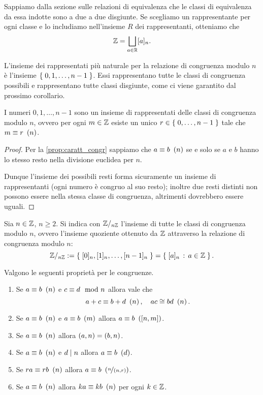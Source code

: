 Sappiamo dalla sezione sulle relazioni di equivalenza che le classi di equivalenza da essa indotte sono a due a due disgiunte. Se scegliamo un rappresentante per ogni classe e lo includiamo nell'insieme $R$ dei rappresentanti, otteniamo che \[
    \mathbb{Z} = \bigsqcup_{a \in \mathbb{R}} [a]_n. 
\]

L'insieme dei rappresentati più naturale per la relazione di congruenza modulo $n$ è l'insieme $\left\{\;0, 1, \dots, n-1\;\right\}$. Essi rappresentano tutte le classi di congruenza possibili e rappresentano tutte classi disgiunte, come ci viene garantito dal prossimo corollario.

\begin{corollary}
    I numeri $0, 1, \dots, n-1$ sono un insieme di rappresentati delle classi di congruenza modulo $n$, ovvero per ogni $m \in \mathbb{Z}$ esiste un unico $r \in \left\{\;0, \dots, n-1\;\right\}$ tale che $m \equiv r \ \left(n\right)$.
\end{corollary}
\begin{proof}
    Per la \autoref{prop:caratt_congr} sappiamo che $a \equiv b \ \left(n\right)$ se e solo se $a$ e $b$ hanno lo stesso resto nella divisione euclidea per $n$.

    Dunque l'insieme dei possibili resti forma sicuramente un insieme di rappresentanti (ogni numero è congruo al suo resto); inoltre due resti distinti non possono essere nella stessa classe di congruenza, altrimenti dovrebbero essere uguali.
\end{proof}

\begin{definition}
    Sia $n \in \mathbb{Z}$, $n \geq 2$. Si indica con $\mathbb{Z}/_{n\mathbb{Z}}$ l'insieme di tutte le classi di congruenza modulo $n$, ovvero l'insieme quoziente ottenuto da $\mathbb{Z}$ attraverso la relazione di congruenza modulo $n$: \begin{equation}
        \mathbb{Z}/_{n\mathbb{Z}} := \left\{\;[0]_n, [1]_n, \dots, [n-1]_n\;\right\} = \left\{\;[a]_n \,:\, a \in \mathbb{Z}\;\right\}.
    \end{equation}
\end{definition}

\begin{proposition}
    Valgono le seguenti proprietà per le congruenze.
    \begin{enumerate}[label={(\arabic*)}]
        \item Se $a \equiv b \ \left(n\right)$ e $c \equiv d \mod n$ allora vale che \[
            a+c \equiv b + d \ \left(n\right), \quad ac \cong bd \ \left(n\right).   
        \]
        \item Se $a \equiv b \ \left(n\right)$ e $a \equiv b \ \left(m\right)$ allora $a \equiv b \ \left(\left[n, m\right]\right)$.
        \item Se $a \equiv b \ \left(n\right)$ allora $\left(a, n\right) = \left(b, n\right)$.
        \item Se $a \equiv b \ \left(n\right)$ e $d \mid n$ allora $a \equiv b \ \left(d\right)$.
        \item Se $ra \equiv rb \ \left(n\right)$ allora $a \equiv b \ \left(\nicefrac{n}{\left(n, r\right)}\right)$.
        \item Se $a \equiv b \ \left(n\right)$ allora $ka \equiv kb \ \left(n\right)$ per ogni $k \in \mathbb{Z}$.
    \end{enumerate}
\end{proposition}
